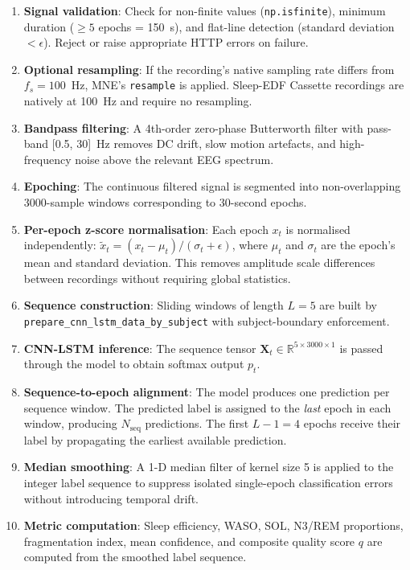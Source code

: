 \documentclass[10pt]{article}
\begin{document}
\begin{enumerate}
  \item \textbf{Signal validation}: Check for non-finite values (\texttt{np.isfinite}), minimum duration ($\geq 5$ epochs = 150~s), and flat-line detection (standard deviation $< \epsilon$). Reject or raise appropriate HTTP errors on failure.
  \item \textbf{Optional resampling}: If the recording's native sampling rate differs from $f_s = 100$~Hz, MNE's \texttt{resample} is applied. Sleep-EDF Cassette recordings are natively at 100~Hz and require no resampling.
  \item \textbf{Bandpass filtering}: A 4th-order zero-phase Butterworth filter with pass-band [0.5, 30]~Hz removes DC drift, slow motion artefacts, and high-frequency noise above the relevant EEG spectrum.
  \item \textbf{Epoching}: The continuous filtered signal is segmented into non-overlapping 3000-sample windows corresponding to 30-second epochs.
  \item \textbf{Per-epoch z-score normalisation}: Each epoch $x_t$ is normalised independently: $\tilde{x}_t = (x_t - \mu_t) / (\sigma_t + \epsilon)$, where $\mu_t$ and $\sigma_t$ are the epoch's mean and standard deviation. This removes amplitude scale differences between recordings without requiring global statistics.
  \item \textbf{Sequence construction}: Sliding windows of length $L=5$ are built by \texttt{prepare\_cnn\_lstm\_data\_by\_subject} with subject-boundary enforcement.
  \item \textbf{CNN-LSTM inference}: The sequence tensor $\mathbf{X}_t \in \mathbb{R}^{5 \times 3000 \times 1}$ is passed through the model to obtain softmax output $p_t$.
  \item \textbf{Sequence-to-epoch alignment}: The model produces one prediction per sequence window. The predicted label is assigned to the \textit{last} epoch in each window, producing $N_{\text{seq}}$ predictions. The first $L-1 = 4$ epochs receive their label by propagating the earliest available prediction.
  \item \textbf{Median smoothing}: A 1-D median filter of kernel size 5 is applied to the integer label sequence to suppress isolated single-epoch classification errors without introducing temporal drift.
  \item \textbf{Metric computation}: Sleep efficiency, WASO, SOL, N3/REM proportions, fragmentation index, mean confidence, and composite quality score $q$ are computed from the smoothed label sequence.
\end{enumerate}
\end{document}
